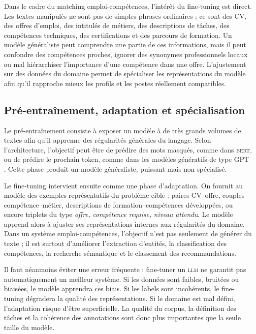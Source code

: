 \documentclass[12pt,twoside]{report}
\newcommand{\BERT}{\textsc{bert}}
\newcommand{\LLM}{\textsc{llm}}
\begin{document}
Dans le cadre du matching emploi-compétences, l'intérêt du fine-tuning est direct. Les textes manipulés ne sont pas de simples phrases ordinaires ; ce sont des CV, des offres d'emploi, des intitulés de métiers, des descriptions de tâches, des compétences techniques, des certifications et des parcours de formation. Un modèle généraliste peut comprendre une partie de ces informations, mais il peut confondre des compétences proches, ignorer des synonymes professionnels locaux ou mal hiérarchiser l'importance d'une compétence dans une offre. L'ajustement sur des données du domaine permet de spécialiser les représentations du modèle afin qu'il rapproche mieux les profils et les postes réellement compatibles.

\subsection{Pré-entraînement, adaptation et spécialisation}
Le pré-entraînement consiste à exposer un modèle à de très grands volumes de textes afin qu'il apprenne des régularités générales du langage. Selon l'architecture, l'objectif peut être de prédire des mots masqués, comme dans \BERT{}, ou de prédire le prochain token, comme dans les modèles génératifs de type GPT \cite{devlin2018bert,brown2020language}. Cette phase produit un modèle généraliste, puissant mais non spécialisé.

Le fine-tuning intervient ensuite comme une phase d'adaptation. On fournit au modèle des exemples représentatifs du problème cible : paires CV--offre, couples compétence--métier, descriptions de formation--compétences développées, ou encore triplets du type \textit{offre, compétence requise, niveau attendu}. Le modèle apprend alors à ajuster ses représentations internes aux régularités du domaine. Dans un système emploi-compétences, l'objectif n'est pas seulement de générer du texte ; il est surtout d'améliorer l'extraction d'entités, la classification des compétences, la recherche sémantique et le classement des recommandations.

Il faut néanmoins éviter une erreur fréquente : fine-tuner un \LLM{} ne garantit pas automatiquement un meilleur système. Si les données sont faibles, bruitées ou biaisées, le modèle apprendra ces biais. Si les labels sont incohérents, le fine-tuning dégradera la qualité des représentations. Si le domaine est mal défini, l'adaptation risque d'être superficielle. La qualité du corpus, la définition des tâches et la cohérence des annotations sont donc plus importantes que la seule taille du modèle.
\end{document}
